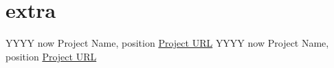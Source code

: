 \section{extra}

\begin{entrylist}
    \entry
    {YYYY now}
    {Project Name, position}
    {\href{https://github.com/antenore}{Project URL}}
    {\blindtext[1]}
    \entry
    {YYYY now}
    {Project Name, position}
    {\href{https://github.com/antenore}{Project URL}}
    {\blinddescription[2]}
\end{entrylist}

